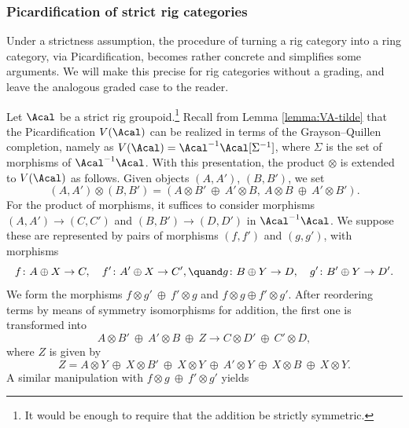 \subsubsection{Picardification of strict rig categories}\label{subsubsec:strict-rig-categories}
Under a strictness assumption, the procedure of turning a rig category into a ring category, via Picardification, becomes rather concrete and simplifies some arguments. We will make this precise for rig categories without a grading, and leave the analogous graded case to the reader.

Let $\Acal$ be a strict rig groupoid.\footnote{It would be enough to require that the addition be strictly symmetric.} Recall from Lemma \ref{lemma:VA-tilde} that the Picardification $V(\Acal)$ can be realized in terms of the Grayson--Quillen completion, namely as \hbox{$V(\Acal)=\Acal^{-1}\Acal[\Sigma^{-1}]$}, where $\Sigma$ is the set of morphisms of $\Acal^{-1}\Acal$. With this presentation, the product $\otimes$ is extended to $V(\Acal)$ as follows. Given objects $(A,A')$, $(B,B')$, we set\vspace*{-3pt}
\begin{equation}\label{eq:explicit-product-A-A}
(A,A')\otimes (B,B')=(A\otimes B'\ \oplus\ A'\otimes B,\ A\otimes B\ \oplus\ A'\otimes B').
\end{equation}
For the product of morphisms, it suffices to consider morphisms $(A,A')\to (C,C')$ and $(B,B')\to (D,D')$ in $\Acal^{-1}\Acal$. We suppose these are represented by pairs of morphisms $(f,f')$ and $(g,g')$, with morphisms\vspace*{-3pt}
\[
f\colon A\oplus X\to C,\quad f'\colon A'\oplus X\to C',\quand g\colon B\oplus Y\to D,\quad g'\colon B'\oplus Y\to D'.
\]
We form the morphisms $f\otimes g'\ \oplus\ f'\otimes g$ and $f\otimes g\oplus f'\otimes g'$. After reordering terms by means of symmetry isomorphisms for addition, the first one is transformed into\vspace*{-3pt}
\begin{equation}\label{eq:product-morphism-1}
A\otimes B'\ \oplus\ A'\otimes B\ \oplus\ Z\to C\otimes D'\ \oplus\ C'\otimes D,
\end{equation}
where $Z$ is given by\vspace*{-3pt}
\begin{displaymath}
Z=A\otimes Y\ \oplus\ X\otimes B'\ \oplus\ X\otimes Y\ \oplus\ A'\otimes Y\ \oplus\ X\otimes B\ \oplus\ X\otimes Y.
\end{displaymath}
A similar manipulation with $f\otimes g\ \oplus\ f'\otimes g'$ yields\vspace*{-3pt}
